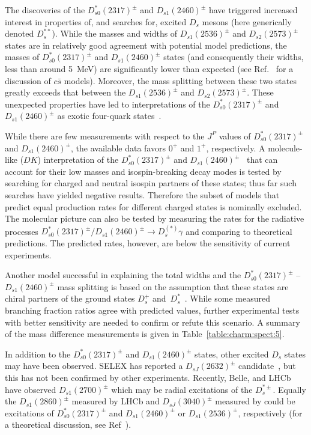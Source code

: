 The discoveries of the $D_{s0}^\ast(2317)^{\pm}$ and $D_{s1}(2460)^{\pm}$ have triggered increased interest in properties of, and searches for, excited $D_s$ mesons (here generically denoted $D_s^{\ast\ast}$). While the masses and widths of $D_{s1}(2536)^{\pm}$ and $D_{s2}(2573)^{\pm}$ states are in relatively good agreement with potential model predictions, the masses of $D_{s0}^\ast(2317)^{\pm}$ and $D_{s1}(2460)^{\pm}$ states (and consequently their widths, less than around 5~MeV) are significantly lower than expected (see Ref.~\cite{PhysRevD.68.037502} for a discussion of $c\bar{s}$ models). Moreover, the mass splitting between these two states greatly exceeds that between the $D_{s1}(2536)^{\pm}$ and $D_{s2}(2573)^{\pm}$. These unexpected properties have led to interpretations of the $D_{s0}^\ast(2317)^{\pm}$ and $D_{s1}(2460)^{\pm}$ as exotic four-quark states~\cite{PhysRevD.68.054006,Lipkin:2003zk}.

While there are few measurements with respect to the $J^P$ values of $D_{s0}^\ast(2317)^{\pm}$ and $D_{s1}(2460)^{\pm}$, the available data favors $0^+$ and $1^+$, respectively. A molecule-like ($DK$) interpretation of the $D_{s0}^\ast(2317)^{\pm}$ and $D_{s1}(2460)^{\pm}$~\cite{Barnes:2003dj,Lipkin:2003zk} that can account for their low masses and isospin-breaking decay modes is tested by searching for charged and neutral isospin partners of these states; thus far such searches have yielded negative results. Therefore the subset of models that predict equal production rates for different charged states is nominally excluded. The molecular picture can also be tested by measuring the rates for the radiative processes $D_{s0}^\ast(2317)^{\pm}/D_{s1}(2460)^{\pm}\to D_s^{(\ast)}\gamma$ and comparing to theoretical predictions. The predicted rates, however, are below the sensitivity of current experiments. 

Another model successful in explaining the total widths and the $D_{s0}^\ast(2317)^{\pm}$ -- $D_{s1}(2460)^{\pm}$ mass splitting is based on the assumption that these states are chiral partners of the ground states $D_{s}^{+}$ and~$D_{s}^{*}$~\cite{PhysRevD.68.054024}. While some measured branching fraction ratios agree with predicted
values, further experimental tests with better sensitivity are needed to confirm or refute this scenario. A summary of the mass difference measurements is given in Table~\ref{table:charm:spect:5}.

In addition to the $D_{s0}^\ast(2317)^{\pm}$ and $D_{s1}(2460)^{\pm}$ states, other excited $D_s$ states may have been observed. SELEX has reported a $D_{sJ}(2632)^{\pm}$ candidate~\cite{Evdokimov:2004iy}, but this has not been confirmed by other experiments. Recently, Belle, \babar{} and LHCb have observed $D_{s1}(2700)^{\pm}$ which may be radial excitations of the $D_s^{\ast\pm}$. Equally the $D_{s1}(2860)^{\pm}$ measured by LHCb and $D_{sJ}(3040)^{\pm}$ measured by \babar{} could be excitations of $D_{s0}^\ast(2317)^{\pm}$ and $D_{s1}(2460)^{\pm}$ or $D_{s1}(2536)^{\pm}$, respectively (for a theoretical discussion, see Ref~\cite{Matsuki:2006rz}).

